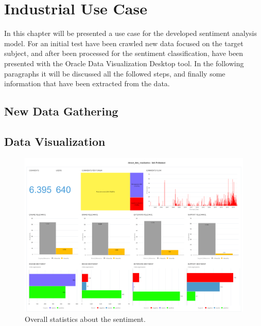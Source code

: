 \chapter{Industrial Use Case}
\label{industrial-use-case}

In this chapter will be presented a use case for the developed sentiment analysis model. For an initial test have been crawled new data focused on the target subject, and after been processed for the sentiment classification, have been presented with the Oracle Data Visualization Desktop tool. In the following paragraphs it will be discussed all the followed steps, and finally some information that have been extracted from the data.

\section{New Data Gathering}





\section{Data Visualization}


\begin{figure}[ht]
	\centering
	\includegraphics[width=\textwidth]{figures/odv_export/dataset_data_visualization_1.pdf}
	\caption{Overall statistics about the sentiment.}
	\label{fig:preliminar-info}
\end{figure}


